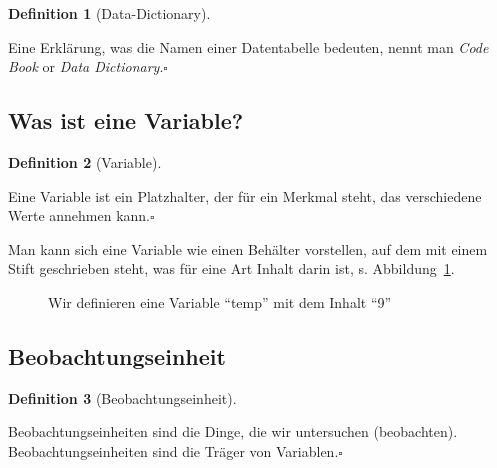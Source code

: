 \documentclass[
  a4paper,
  DIV=11]{scrreprt}
\theoremstyle{definition}
\theoremstyle{definition}
\theoremstyle{definition}
\newtheorem{definition}{Definition}[chapter]
\theoremstyle{remark}
\begin{document}
\begin{definition}[Data-Dictionary]\protect\hypertarget{def-datadict}{}\label{def-datadict}

Eine Erklärung, was die Namen einer Datentabelle bedeuten, nennt man
\emph{Code Book} or \emph{Data Dictionary}.\(\square\)

\end{definition}

\subsection{Was ist eine Variable?}\label{was-ist-eine-variable}

\begin{definition}[Variable]\protect\hypertarget{def-var}{}\label{def-var}

Eine Variable ist ein Platzhalter, der für ein Merkmal steht, das
verschiedene Werte annehmen kann.\(\square\)

\end{definition}

Man kann sich eine Variable wie einen Behälter vorstellen, auf dem mit
einem Stift geschrieben steht, was für eine Art Inhalt darin ist, s.
Abbildung~\ref{fig-var-zuweisen}.

\begin{figure}


\caption{\label{fig-var-zuweisen}Wir definieren eine Variable ``temp''
mit dem Inhalt ``9''}

\end{figure}%

\subsection{Beobachtungseinheit}\label{beobachtungseinheit}

\begin{definition}[Beobachtungseinheit]\protect\hypertarget{def-beobeinheit}{}\label{def-beobeinheit}

Beobachtungseinheiten sind die Dinge, die wir untersuchen (beobachten).
Beobachtungseinheiten sind die Träger von Variablen.\(\square\)

\end{definition}
\end{document}
